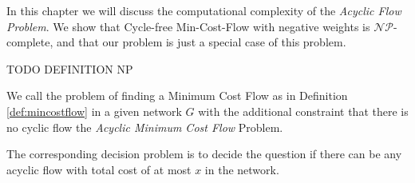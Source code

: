 In this chapter we will discuss the computational complexity of the \textit{Acyclic Flow Problem}. We show that 
Cycle-free Min-Cost-Flow with negative weights is $\mathcal{NP}$-complete, and that our problem is just a special case 
of this problem. 

TODO DEFINITION NP

\begin{definition}
 We call the problem of finding a Minimum Cost Flow as in Definition \ref{def:mincostflow} in a given 
network $G$ with the additional constraint  that there is no cyclic flow the \textit{Acyclic Minimum Cost Flow} 
Problem. 

The corresponding decision problem is to decide the question if there can be any acyclic flow with total cost of at 
most $x$ in the network.%
\end{definition}

